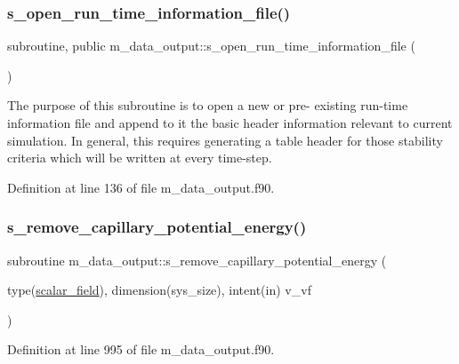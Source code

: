 \subsubsection{\texorpdfstring{s\+\_\+open\+\_\+run\+\_\+time\+\_\+information\+\_\+file()}{s\_open\_run\_time\_information\_file()}}
{\footnotesize\ttfamily subroutine, public m\+\_\+data\+\_\+output\+::s\+\_\+open\+\_\+run\+\_\+time\+\_\+information\+\_\+file (\begin{DoxyParamCaption}{ }\end{DoxyParamCaption})}



The purpose of this subroutine is to open a new or pre-\/ existing run-\/time information file and append to it the basic header information relevant to current simulation. In general, this requires generating a table header for those stability criteria which will be written at every time-\/step. 



Definition at line 136 of file m\+\_\+data\+\_\+output.\+f90.

\mbox{\label{namespacem__data__output_a178b41597f79f2c0a42c0d6e65275b71}} 
\subsubsection{\texorpdfstring{s\+\_\+remove\+\_\+capillary\+\_\+potential\+\_\+energy()}{s\_remove\_capillary\_potential\_energy()}}
{\footnotesize\ttfamily subroutine m\+\_\+data\+\_\+output\+::s\+\_\+remove\+\_\+capillary\+\_\+potential\+\_\+energy (\begin{DoxyParamCaption}\item[{type(\hyperlink{structm__derived__types_1_1scalar__field}{scalar\+\_\+field}), dimension(sys\+\_\+size), intent(in)}]{v\+\_\+vf }\end{DoxyParamCaption})}



Definition at line 995 of file m\+\_\+data\+\_\+output.\+f90.

\mbox{\label{namespacem__data__output_a40724c992117a24479573d9fbcdfa21b}} 
